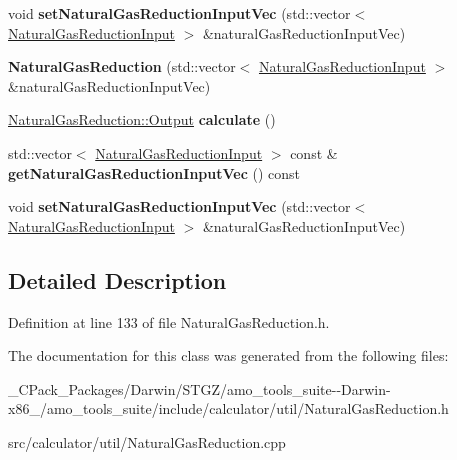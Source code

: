 \begin{DoxyCompactItemize}
\mbox{\label{class_natural_gas_reduction_a37d449a4d5f274fdebb855c1f8d0d32d}} 
void {\bfseries set\+Natural\+Gas\+Reduction\+Input\+Vec} (std\+::vector$<$ \hyperlink{class_natural_gas_reduction_input}{Natural\+Gas\+Reduction\+Input} $>$ \&natural\+Gas\+Reduction\+Input\+Vec)
\item 
\mbox{\label{class_natural_gas_reduction_a7648caebf3f12a0c7bb347e9d18e64d8}} 
{\bfseries Natural\+Gas\+Reduction} (std\+::vector$<$ \hyperlink{class_natural_gas_reduction_input}{Natural\+Gas\+Reduction\+Input} $>$ \&natural\+Gas\+Reduction\+Input\+Vec)
\item 
\mbox{\label{class_natural_gas_reduction_ae9eed40d094032c9b7a493e995d6d21d}} 
\hyperlink{struct_natural_gas_reduction_1_1_output}{Natural\+Gas\+Reduction\+::\+Output} {\bfseries calculate} ()
\item 
\mbox{\label{class_natural_gas_reduction_a3ad91a742c48fd1fcc39e8371efa46b6}} 
std\+::vector$<$ \hyperlink{class_natural_gas_reduction_input}{Natural\+Gas\+Reduction\+Input} $>$ const  \& {\bfseries get\+Natural\+Gas\+Reduction\+Input\+Vec} () const
\item 
\mbox{\label{class_natural_gas_reduction_a37d449a4d5f274fdebb855c1f8d0d32d}} 
void {\bfseries set\+Natural\+Gas\+Reduction\+Input\+Vec} (std\+::vector$<$ \hyperlink{class_natural_gas_reduction_input}{Natural\+Gas\+Reduction\+Input} $>$ \&natural\+Gas\+Reduction\+Input\+Vec)
\end{DoxyCompactItemize}


\subsection{Detailed Description}


Definition at line 133 of file Natural\+Gas\+Reduction.\+h.



The documentation for this class was generated from the following files\+:\begin{DoxyCompactItemize}
\item 
\+\_\+\+C\+Pack\+\_\+\+Packages/\+Darwin/\+S\+T\+G\+Z/amo\+\_\+tools\+\_\+suite-\/-\/\+Darwin-\/x86\+\_/amo\+\_\+tools\+\_\+suite/include/calculator/util/Natural\+Gas\+Reduction.\+h\item 
src/calculator/util/Natural\+Gas\+Reduction.\+cpp\end{DoxyCompactItemize}
